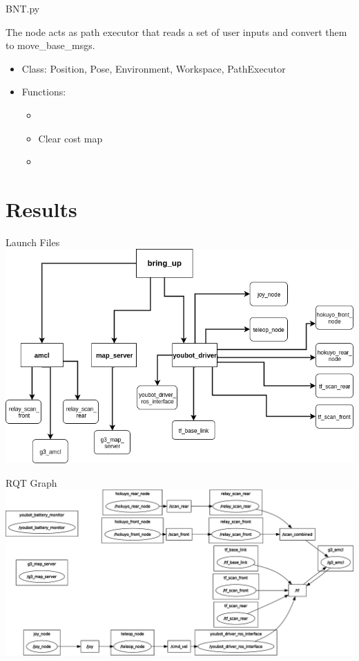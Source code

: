 \documentclass[12pt,aspectratio=43,xcolor={usenames,dvipsnames,table}]{beamer}
\begin{document}
\begin{frame}{BNT.py}

The node acts as path executor that reads  a set of user inputs and convert them to move\_base\_msgs.
\begin{itemize}
	\item Class: Position, Pose, Environment, Workspace, PathExecutor
	
	\item Functions:
		\begin{itemize}
			\item 
			\item Clear cost map
			\item 
		\end{itemize}
\end{itemize}

\end{frame}

\section{Results}
\begin{frame}{Launch Files}
    \centering
    \includegraphics[width=\textwidth]{gfx/launchfile.png}
\end{frame}
\begin{frame}{RQT Graph}
    \centering
    \includegraphics[width=\textwidth]{gfx/rosgraph}
\end{frame}
\end{document}
